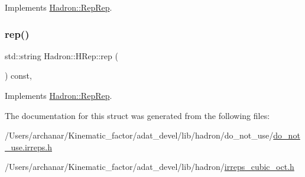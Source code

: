 Implements \mbox{\hyperlink{structHadron_1_1RepRep_ab3213025f6de249f7095892109575fde}{Hadron\+::\+Rep\+Rep}}.

\mbox{\label{structHadron_1_1HRep_aa90a43bdbf19213e75180e0457ae36d0}} 
\subsubsection{\texorpdfstring{rep()}{rep()}\hspace{0.1cm}{\footnotesize\ttfamily [3/3]}}
{\footnotesize\ttfamily std\+::string Hadron\+::\+H\+Rep\+::rep (\begin{DoxyParamCaption}{ }\end{DoxyParamCaption}) const\hspace{0.3cm}{\ttfamily [inline]}, {\ttfamily [virtual]}}



Implements \mbox{\hyperlink{structHadron_1_1RepRep_ab3213025f6de249f7095892109575fde}{Hadron\+::\+Rep\+Rep}}.



The documentation for this struct was generated from the following files\+:\begin{DoxyCompactItemize}
\item 
/\+Users/archanar/\+Kinematic\+\_\+factor/adat\+\_\+devel/lib/hadron/do\+\_\+not\+\_\+use/\mbox{\hyperlink{do__not__use_8irreps_8h}{do\+\_\+not\+\_\+use.\+irreps.\+h}}\item 
/\+Users/archanar/\+Kinematic\+\_\+factor/adat\+\_\+devel/lib/hadron/\mbox{\hyperlink{lib_2hadron_2irreps__cubic__oct_8h}{irreps\+\_\+cubic\+\_\+oct.\+h}}\end{DoxyCompactItemize}
